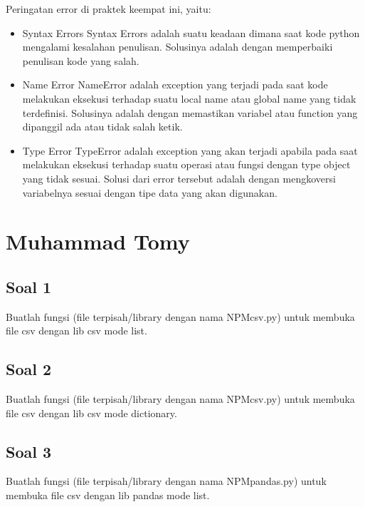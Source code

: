 Peringatan error di praktek keempat ini, yaitu:
\begin{itemize}
	\item Syntax Errors
	Syntax Errors adalah suatu keadaan dimana saat kode python mengalami kesalahan penulisan. Solusinya adalah dengan memperbaiki penulisan kode yang salah.
	
	\item Name Error
	NameError adalah exception yang terjadi pada saat kode melakukan eksekusi terhadap suatu local name atau global name yang tidak terdefinisi. Solusinya adalah dengan memastikan variabel atau function yang dipanggil ada atau tidak salah ketik.
	
	\item Type Error
	TypeError adalah exception yang akan terjadi apabila pada saat melakukan eksekusi terhadap suatu operasi atau fungsi dengan type object yang tidak sesuai. Solusi dari error tersebut adalah dengan mengkoversi variabelnya sesuai dengan tipe data yang akan digunakan.
\end{itemize}


\section{Muhammad Tomy}
\subsection{Soal 1}
Buatlah  fungsi  (file  terpisah/library  dengan  nama  NPMcsv.py)  untuk  membuka file csv dengan lib csv mode list.



\subsection{Soal 2}
Buatlah  fungsi  (file  terpisah/library  dengan  nama  NPMcsv.py)  untuk  membuka file csv dengan lib csv mode dictionary.



\subsection{Soal 3}
Buatlah fungsi (file terpisah/library dengan nama NPMpandas.py) untuk membuka file csv dengan lib pandas mode list.

